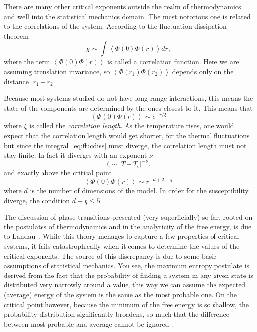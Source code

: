 There are many other critical exponents outside the realm of thermodynamics and
well into the statistical mechanics domain. The most notorious one is related
to the correlations of the system. According to the fluctuation-dissipation
theorem
\begin{equation}
    \label{eq:flucdiss}
    \chi\sim
    \int\left\langle \Phi\left(0\right)\Phi\left(r\right)\right\rangle dr,
\end{equation}
where the term $\left\langle \Phi\left(0\right)\Phi\left(r\right)\right\rangle$
is called a correlation function. Here we are assuming translation invariance,
so $\left\langle \Phi\left(r_1\right)\Phi\left(r_2\right)\right\rangle$ depends
only on the distance $|r_1-r_2|$.

Because most systems studied do not have long range interactions, this means
the state of the components are determined by the ones closest to it. This means
that 
\begin{equation}
    \left\langle \Phi\left(0\right)\Phi\left(r\right)\right\rangle \sim e^{-r/\xi}
\end{equation}
where $\xi$ is called the \textit{correlation length}. As the temperature
rises, one would expect that the correlation length would get shorter, for the
thermal fluctuations but since the integral~\ref{eq:flucdiss} must diverge, the
correlation length must not stay finite. In fact it diverges with an exponent
$\nu$
\begin{equation}
    \xi\sim{\left|T-T_c\right|}^{-\nu}.
\end{equation}
and exactly above the critical point 
\begin{equation}
    \left\langle \Phi\left(0\right)\Phi\left(r\right)\right\rangle
    \sim r^{-d+2-\eta}
\end{equation}
where $d$ is the number of dimensions of the model. In order for the susceptibility
diverge, the condition $d+\eta\leq5$

The discussion of phase transitions presented (very superficially) so far,
rooted on the postulates of thermodynamics and in the analyticity of the free
energy, is due to Landau~\cite{Landau1969}. While this theory menages to
capture a few properties of critical systems, it fails catastrophically when it
comes to determine the values of the critical exponents. The source of this
discrepancy is due to some basic assumptions of statistical mechanics. You see,
the maximum entropy postulate is derived from the fact that the probability of
finding a system in any given state is distributed very narrowly around a
value, this way we can assume the expected (average) energy of the system is
the same as the most probable one. On the critical point however, because
the minimum of the free energy is so shallow, the probability distribution
significantly broadens, so much that the difference between most probable and
average cannot be ignored~\cite{Callen1985}.

